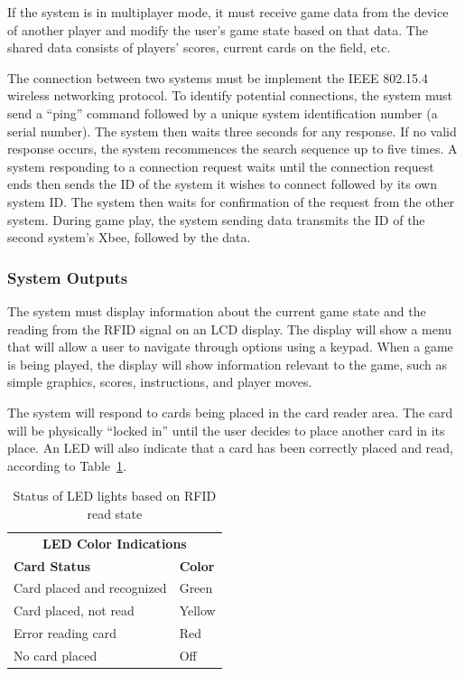 \documentclass[12pt]{article} %
\begin{document}
If the system is in multiplayer mode, it must receive game data from the device of another player and modify the user's game state based on that data. The shared data consists of players’ scores, current cards on the field, etc.

The connection between two systems must be implement the IEEE 802.15.4 wireless networking protocol. To identify potential connections, the system must send a “ping” command followed by a unique system identification number (a serial number). The system then waits three seconds for any response. If no valid response occurs, the system recommences the search sequence up to five times. A system responding to a connection request waits until the connection request ends then sends the ID of the system it wishes to connect followed by its own system ID. The system then waits for confirmation of the request from the other system. During game play, the system sending data transmits the ID of the second system's Xbee, followed by the data.

\subsubsection{System Outputs}\label{outputs}

The system must display information about the current game state and the reading from the RFID signal on an LCD display.  The display will show a menu that will allow a user to navigate through options using a keypad.  When a game is being played, the display will show information relevant to the game, such as simple graphics, scores, instructions, and player moves.

The system will respond to cards being placed in the card reader area.  The card will be physically “locked in” until the user decides to place another card in its place.  An LED will also indicate that a card has been correctly placed and read, according to Table~\ref{Tab:LEDTable}.

\begin{table}[h]
	\begin{tabular}{ll}
		\multicolumn{2}{c}{\textbf{LED Color Indications}} \\
		\textbf{Card Status}           & \textbf{Color}    \\
		Card placed and recognized     & Green             \\
		Card placed, not read          & Yellow            \\
		Error reading card             & Red               \\
		No card placed                 & Off              
	\end{tabular}
	\caption{Status of LED lights based on RFID read state}
	\label{Tab:LEDTable}
\end{table}
\end{document}
